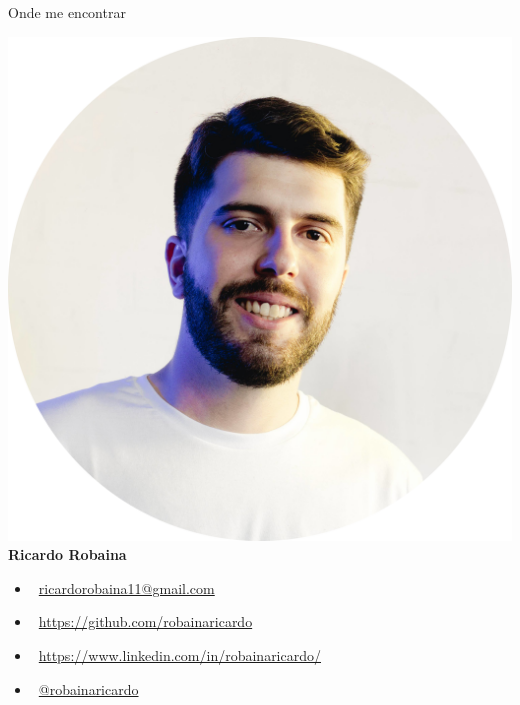 \documentclass[aspectratio=1610]{beamer}
\begin{document}
	\begin{frame}{Onde me encontrar}

			\centering
			\includegraphics[scale = 0.15]{fig/fig_eu.png} \\
			\textbf{Ricardo Robaina} \\
			\begin{itemize}{  }
				\item \faEnvelope\ \url{ricardorobaina11@gmail.com}
				\item \faGithub\ \url{https://github.com/robainaricardo}
				\item \faLinkedin\ \url{https://www.linkedin.com/in/robainaricardo/}
				\item \faInstagram\ \href{https://www.instagram.com/robainaricardo/?hl=pt-br}{\url{@robainaricardo}}
			\end{itemize}
	
	\end{frame}
\end{document}
